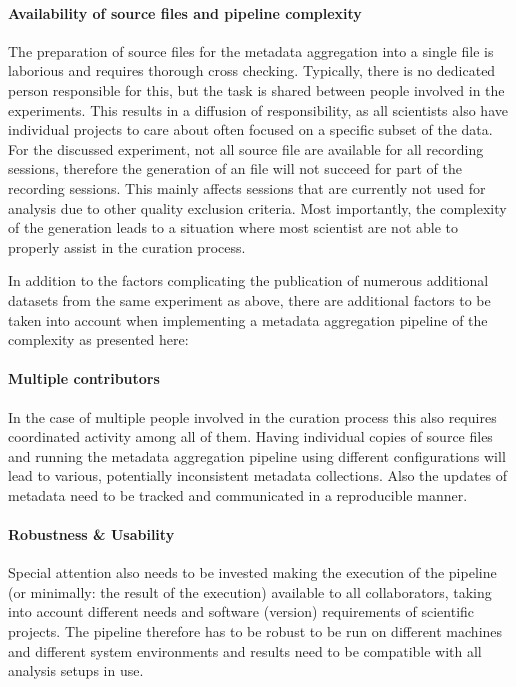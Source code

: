 \paragraph{Availability of source files and pipeline complexity}
The preparation of source files for the metadata aggregation into a single  file is laborious and requires thorough cross checking. Typically, there is no dedicated person responsible for this, but the task is shared between people involved in the experiments. This results in a diffusion of responsibility, as all scientists also have individual projects to care about often focused on a specific subset of the data. For the discussed experiment, not all source file are available for all recording sessions, therefore the generation of an  file will not succeed for part of the recording sessions. This mainly affects sessions that are currently not used for analysis due to other quality exclusion criteria. Most importantly, the complexity of the  generation leads to a situation where most scientist are not able to properly assist in the curation process.
\newline

In addition to the factors complicating the publication of numerous additional datasets from the same experiment as above, there are additional factors to be taken into account when implementing a metadata aggregation pipeline of the complexity as presented here:

\paragraph{Multiple contributors}
In the case of multiple people involved in the curation process this also requires coordinated activity among all of them. Having individual copies of source files and running the metadata aggregation pipeline using different configurations will lead to various, potentially inconsistent metadata collections. Also the updates of metadata need to be tracked and communicated in a reproducible manner.

\paragraph{Robustness \& Usability}
Special attention also needs to be invested making the execution of the pipeline (or minimally: the result of the execution) available to all collaborators, taking into account different needs and software (version) requirements of scientific projects. The pipeline therefore has to be robust to be run on different machines and different system environments and results need to be compatible with all analysis setups in use.

